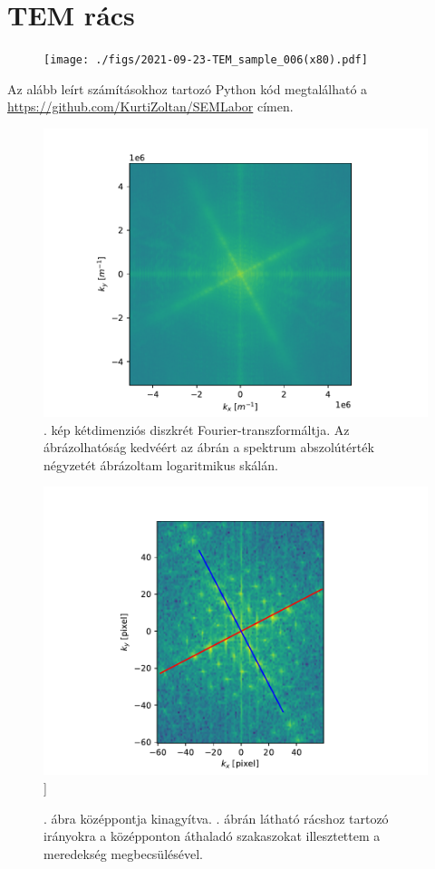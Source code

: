 \documentclass[pdftex,12pt,a4paper]{article}
\begin{document}
	\section{TEM rács}
		\begin{figure}[H]
			\centering
			\texttt{[image: ./figs/2021-09-23-TEM\_sample\_006(x80).pdf]}
			\caption{}
			\label{temgrid}
		\end{figure}
		Az alább leírt számításokhoz tartozó Python kód megtalálható a \url{https://github.com/KurtiZoltan/SEMLabor} címen.
		
		
		\begin{figure}[H]
			\centering
			\includegraphics[scale=1]{./figs/2dfft.pdf}
			\caption{. kép kétdimenziós diszkrét Fourier-transzformáltja. Az ábrázolhatóság kedvéért az ábrán a spektrum abszolútérték négyzetét ábrázoltam logaritmikus skálán.}
			\label{2dfft}
		\end{figure}
		\begin{figure}[H]
			\centering
			\includegraphics[scale=1]{./figs/fftlines.pdf}]
			\caption{. ábra középpontja kinagyítva. . ábrán látható rácshoz tartozó irányokra a középponton áthaladó szakaszokat illesztettem a meredekség megbecsülésével.}
			\label{fftlines}
		\end{figure}
\end{document}
